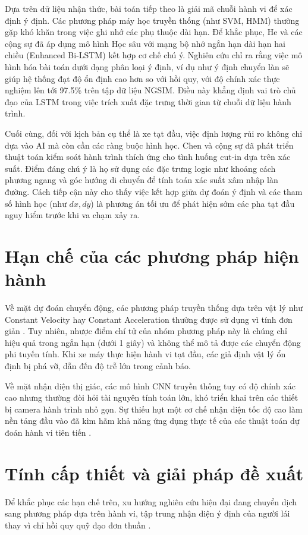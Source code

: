 	Dựa trên dữ liệu nhận thức, bài toán tiếp theo là giải mã chuỗi hành vi để xác định ý định. Các phương pháp máy học truyền thống (như SVM, HMM) thường gặp khó khăn trong việc ghi nhớ các phụ thuộc dài hạn. Để khắc phục, He và các cộng sự \cite{He2023VehicleDI} đã áp dụng mô hình Học sâu với mạng bộ nhớ ngắn hạn dài hạn hai chiều (Enhanced Bi-LSTM) kết hợp cơ chế chú ý. Nghiên cứu chỉ ra rằng việc mô hình hóa bài toán dưới dạng phân loại ý định, ví dụ như ý định chuyển làn sẽ giúp hệ thống đạt độ ổn định cao hơn so với hồi quy, với độ chính xác thực nghiệm lên tới 97.5\% trên tập dữ liệu NGSIM. Điều này khẳng định vai trò chủ đạo của LSTM trong việc trích xuất đặc trưng thời gian từ chuỗi dữ liệu hành trình.
	
	Cuối cùng, đối với kịch bản cụ thể là xe tạt đầu, việc định lượng rủi ro không chỉ dựa vào AI mà còn cần các ràng buộc hình học. Chen và cộng sự \cite{Chen2021} đã phát triển thuật toán kiểm soát hành trình thích ứng cho tình huống cut-in dựa trên xác suất. Điểm đáng chú ý là họ sử dụng các đặc trưng logic như khoảng cách phương ngang và góc hướng di chuyển để tính toán xác suất xâm nhập làn đường. Cách tiếp cận này cho thấy việc kết hợp giữa dự đoán ý định và các tham số hình học (như $dx, dy$) là phương án tối ưu để phát hiện sớm các pha tạt đầu nguy hiểm trước khi va chạm xảy ra.

	\section{Hạn chế của các phương pháp hiện hành}
	Về mặt dự đoán chuyển động, các phương pháp truyền thống dựa trên vật lý như Constant Velocity hay Constant Acceleration thường được sử dụng vì tính đơn giản \cite{Lefvre2014ASO}. Tuy nhiên, nhược điểm chí tử của nhóm phương pháp này là chúng chỉ hiệu quả trong ngắn hạn (dưới 1 giây) và không thể mô tả được các chuyển động phi tuyến tính. Khi xe máy thực hiện hành vi tạt đầu, các giả định vật lý ổn định bị phá vỡ, dẫn đến độ trễ lớn trong cảnh báo.
	
	Về mặt nhận diện thị giác, các mô hình CNN truyền thống tuy có độ chính xác cao nhưng thường đòi hỏi tài nguyên tính toán lớn, khó triển khai trên các thiết bị camera hành trình nhỏ gọn. Sự thiếu hụt một cơ chế nhận diện tốc độ cao làm nền tảng đầu vào đã kìm hãm khả năng ứng dụng thực tế của các thuật toán dự đoán hành vi tiên tiến \cite{Mozaffari2020DeepLV}.
	
	\section{Tính cấp thiết và giải pháp đề xuất}
	Để khắc phục các hạn chế trên, xu hướng nghiên cứu hiện đại đang chuyển dịch sang phương pháp dựa trên hành vi, tập trung nhận diện ý định của người lái thay vì chỉ hồi quy quỹ đạo đơn thuần \cite{Zeng2025TrajectoryPF}.
	
